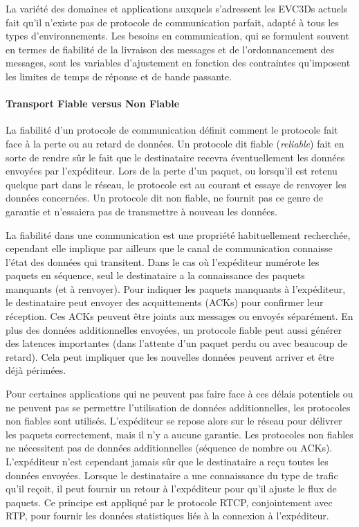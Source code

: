 La variété des domaines et applications auxquels s'adressent les 
\glspl{EVC3D} actuels fait qu'il n'existe pas de protocole de 
communication parfait, adapté à tous les types d'environnements. 
Les besoins en communication, qui se formulent souvent en termes de 
fiabilité de la livraison des messages et de l'ordonnancement des messages, sont 
les variables d'ajustement en fonction des contraintes qu'imposent les limites de 
temps de réponse et de bande passante.

\paragraph{Transport Fiable versus Non Fiable}
\label{sec:fiabilite}
La fiabilité d'un protocole de communication définit comment le protocole fait face 
à la perte ou au retard de données. Un protocole dit \og fiable\fg{} (\textit{reliable}) 
fait en sorte de rendre sûr le fait que le destinataire recevra éventuellement les 
données envoyées par l'expéditeur. Lors de la perte d'un paquet, ou lorsqu'il est 
retenu quelque part dans le réseau, le protocole est au courant et essaye de 
renvoyer les données concernées. Un protocole dit \og non fiable\fg{}, ne fournit 
pas ce genre de garantie et n'essaiera pas de transmettre à nouveau les données.

La fiabilité dans une communication est une propriété habituellement 
recherchée, cependant elle implique par ailleurs que le canal de communication 
connaisse l'état des données qui transitent. Dans le cas où l'expéditeur numérote 
les paquets en séquence, seul le destinataire a la connaissance des paquets manquants (et à 
renvoyer). Pour indiquer les paquets manquants à l'expéditeur, le destinataire peut 
envoyer des acquittements (ACKs) pour confirmer leur réception. Ces ACKs 
peuvent être joints aux messages ou envoyés séparément. En plus des données 
additionnelles envoyées, un protocole fiable peut aussi générer des latences 
importantes (dans l'attente d'un paquet perdu ou avec beaucoup de retard). Cela peut 
impliquer que les \og nouvelles\fg{} données peuvent arriver et être déjà 
périmées.

Pour certaines applications qui ne peuvent pas faire face à ces délais potentiels 
ou ne peuvent pas se permettre l'utilisation de données additionnelles, les protocoles non fiables 
sont utilisés. 
L'expéditeur se repose alors sur le réseau pour délivrer les paquets 
correctement, mais il n'y a aucune garantie. Les protocoles non fiables ne 
nécessitent pas de données additionnelles (séquence de nombre ou ACKs). 
L'expéditeur n'est cependant jamais sûr que le destinataire a reçu toutes les 
données envoyées. Lorsque le destinataire a une connaissance du type de trafic qu'il reçoit, 
il peut fournir un retour à l'expéditeur pour qu'il ajuste le flux de paquets. Ce 
principe est appliqué par le protocole \gls{RTCP}, conjointement avec \gls{RTP}, 
pour fournir les données statistiques liés à la  connexion à l'expéditeur.


